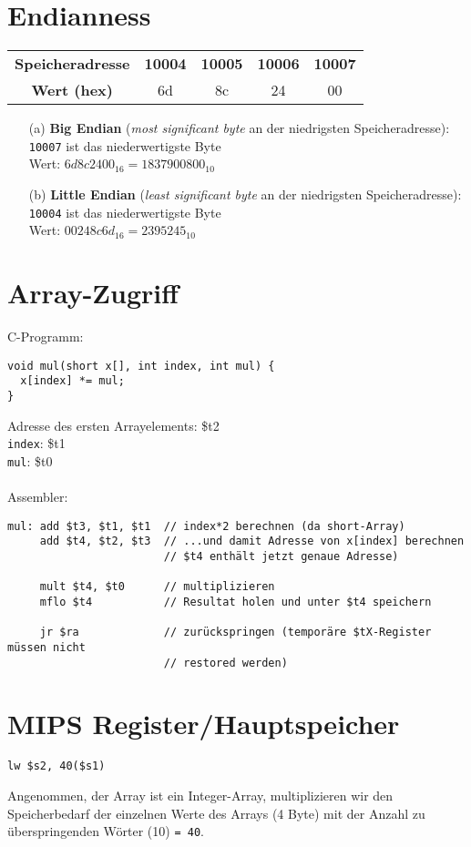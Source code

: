 \documentclass[a4paper,10pt,headlines=3.2]{scrartcl}
\begin{document}
\section{Endianness}
\begin{center}
\begin{tabular}{ccccc}
\textbf{Speicheradresse} & \textbf{10004} & \textbf{10005} & \textbf{10006} & \textbf{10007}\\
\textbf{Wert (hex)} & 6d & 8c & 24 & 00
\end{tabular}
\end{center}

\begin{itemize}
\item[(a)] \textbf{Big Endian} (\textit{most significant byte} an der niedrigsten Speicheradresse): \\
\texttt{10007} ist das niederwertigste Byte\\
Wert: $6d8c2400_{16} = 1837900800_{10}$
\item[(b)] \textbf{Little Endian} (\textit{least significant byte} an der niedrigsten Speicheradresse): \\
\texttt{10004} ist das niederwertigste Byte\\
Wert: $00248c6d_{16} = 2395245_{10}$
\end{itemize}

\section{Array-Zugriff}
C-Programm:
\begin{verbatim}
void mul(short x[], int index, int mul) {
  x[index] *= mul;
}
\end{verbatim}
Adresse des ersten Arrayelements: \$t2 \\
\texttt{index}: \$t1 \\
\texttt{mul}: \$t0 \\\\
Assembler:
\begin{verbatim}
mul: add $t3, $t1, $t1  // index*2 berechnen (da short-Array)
     add $t4, $t2, $t3  // ...und damit Adresse von x[index] berechnen
                        // $t4 enthält jetzt genaue Adresse)
     
     mult $t4, $t0      // multiplizieren
     mflo $t4           // Resultat holen und unter $t4 speichern
     
     jr $ra             // zurückspringen (temporäre $tX-Register müssen nicht
                        // restored werden)
\end{verbatim}


\section{MIPS Register/Hauptspeicher}
\begin{verbatim}
lw $s2, 40($s1)
\end{verbatim}
Angenommen, der Array ist ein Integer-Array, multiplizieren wir den Speicherbedarf der einzelnen Werte des Arrays (4 Byte) mit der Anzahl zu überspringenden Wörter (10) \texttt{= 40}.
\end{document}

